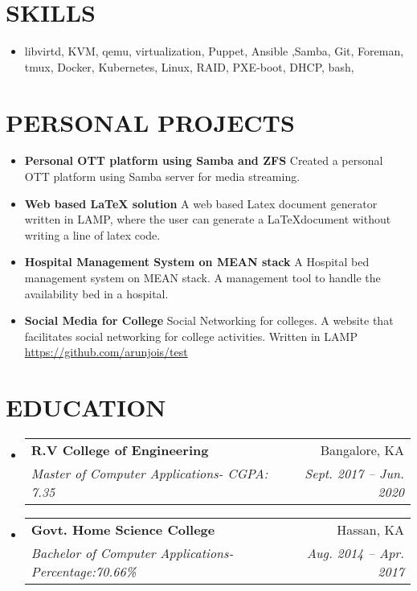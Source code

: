 \documentclass[letterpaper,11pt]{article}
\makeatletter
\newcommand{\resumeItem}[2]{
	\item\small{
		\textbf{#1}{ #2 \vspace{-2pt}}
	}
}
\newcommand{\resumeSubheading}[4]{
	\vspace{-1pt}\item
	\begin{tabular*}{0.97\textwidth}[t]{l@{\extracolsep{\fill}}r}
		\textbf{#1} & #2 \\
		\textit{\small#3} & \textit{\small #4} \\
	\end{tabular*}\vspace{-5pt}
}
\newcommand{\resumeSubItem}[2]{\resumeItem{#1}{#2}\vspace{-4pt}}
\newcommand{\resumeSubHeadingListStart}{\begin{itemize}[leftmargin=*]}
\newcommand{\resumeSubHeadingListEnd}{\end{itemize}}
\makeatother
\begin{document}
	
	\section{\textbf{SKILLS}}
	\resumeSubHeadingListStart
	\resumeItem{}
	{libvirtd, KVM, qemu, virtualization, Puppet, Ansible ,Samba, Git, Foreman, tmux, 
		Docker, Kubernetes, Linux, RAID, PXE-boot, DHCP, bash, }
	
	\resumeSubHeadingListEnd
	\section{\textbf{PERSONAL PROJECTS}}
	\resumeSubHeadingListStart
	\resumeSubItem{Personal OTT platform using Samba and ZFS}{Created a personal OTT platform using Samba server for media streaming.}
	\resumeSubItem{Web based LaTeX solution}
	{A web based Latex document generator written in LAMP, where the user can generate 
	a \LaTeX  document without writing a line of latex code. }
	\resumeSubItem{Hospital Management System on MEAN stack}
	{A Hospital bed management system on MEAN stack. 
	A management tool to handle the availability bed in a hospital.}
	\resumeSubItem{Social Media for College}
	{Social Networking for colleges. A website that facilitates social networking for college activities. Written in LAMP \href{https://github.com/arunjois/test} {https://github.com/arunjois/test}}
	\resumeSubHeadingListEnd
	\section{\textbf{EDUCATION}}
	\resumeSubHeadingListStart
	\resumeSubheading
	{R.V College of Engineering}{Bangalore, KA}
	{Master of Computer Applications-  CGPA: 7.35}{Sept. 2017 -- Jun. 2020}
	\resumeSubheading
	{Govt. Home Science College}{Hassan, KA}
	{Bachelor of Computer Applications-  Percentage:70.66\% }{Aug. 2014 -- Apr. 2017}
	\resumeSubHeadingListEnd
	
	
	
	
\end{document}
